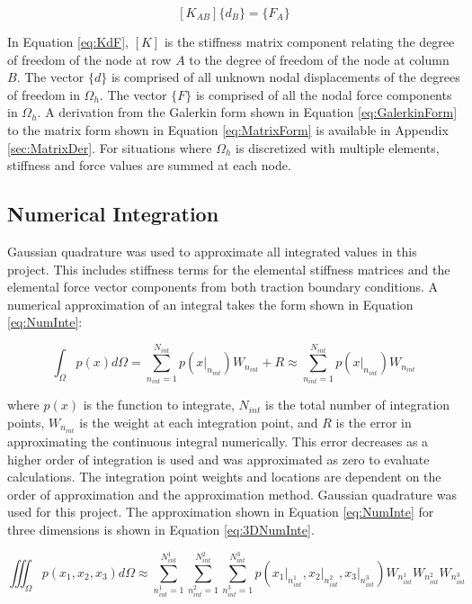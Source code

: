 \documentclass[a4paper, 12pt]{article}
\begin{document}
\begin{equation} \label{eq:KdF}
[ K_{AB} ] \{ d_B \} = \{ F_A \}
\end{equation}

\noindent
In Equation \ref{eq:KdF}, $[K]$ is the stiffness matrix component
relating the degree of freedom of the node at row $A$ to the degree of freedom
of the node at column $B$. The vector $\{d\}$ is comprised of all unknown
nodal displacements of the degrees of freedom in $\Omega_h$. The
vector $\{F\}$ is comprised of all the nodal force components in $\Omega_h$.
A derivation from the Galerkin form shown in Equation \ref{eq:GalerkinForm}
to the matrix form shown in Equation \ref{eq:MatrixForm} is available in Appendix
\ref{sec:MatrixDer}. For situations where $\Omega_h$ is discretized with
multiple elements, stiffness and force values are summed at each node.

\subsection{Numerical Integration} \label{subsec:numInt}
Gaussian quadrature was used to approximate all integrated
values in this project. This includes stiffness terms
for the elemental stiffness matrices and the elemental force vector components
from both traction boundary conditions.
A numerical approximation of an integral takes the form shown in
Equation \ref{eq:NumInte}:

\begin{equation} \label{eq:NumInte}
\int_{\Omega} p(x) d\Omega
  = \sum_{n_{int}=1}^{N_{int}} p(x\Big|_{n_{int}}) W_{n_{int}} + R
  \approx \sum_{n_{int}=1}^{N_{int}} p(x\Big|_{n_{int}}) W_{n_{int}}
\end{equation}

\noindent
where $p(x)$ is the function to integrate, $N_{int}$ is the total number
of integration points, $W_{n_{int}}$ is the weight at each integration point,
and $R$ is the error in approximating the continuous integral numerically.
This error decreases as a higher order of integration is used and was
approximated as zero to evaluate calculations.
The integration point weights and locations are dependent on the order of
approximation and the approximation method. Gaussian quadrature was
used for this project. The approximation shown in Equation \ref{eq:NumInte}
for three dimensions is shown in Equation \ref{eq:3DNumInte}.

\begin{equation} \label{eq:3DNumInte}
\iiint_{\Omega} p(x_1, x_2, x_3) d\Omega \approx
  \sum_{n^1_{int}=1}^{N^1_{int}}
  \sum_{n^2_{int}=1}^{N^2_{int}}
  \sum_{n^3_{int}=1}^{N^3_{int}}
  p(x_1\Big|_{n^1_{int}},
  x_2\Big|_{n^2_{int}},
  x_3\Big|_{n^3_{int}})
  W_{n^1_{int}}
  W_{n^2_{int}}
  W_{n^3_{int}}
\end{equation}
\end{document}
